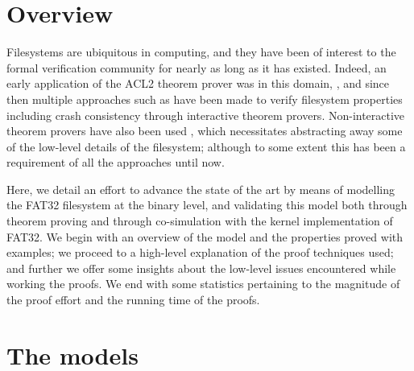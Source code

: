\documentclass[runningheads,a4paper]{llncs}
\begin{document}
\section{Overview}

Filesystems are ubiquitous in computing, and they have been of
interest to the formal verification community for nearly as long as it
has existed. Indeed, an early application of the ACL2 theorem prover
was in this domain, \cite{bevier1996executable}, and since then
multiple approaches such as \cite{DBLP:conf/usenix/ChenZCCKZ16} have
been made to verify filesystem properties including crash consistency
through interactive theorem provers. Non-interactive theorem provers
have also been used \cite{Nelson:2017:HPV:3132747.3132748}, which
necessitates abstracting away some of the low-level details of the
filesystem; although to some extent this has been a requirement of all
the approaches until now.

Here, we detail an effort to advance the state of the art
by means of modelling the FAT32 filesystem at the binary level, and
validating this model both through theorem proving and through
co-simulation with the kernel implementation of FAT32. We begin with
an overview of the model and the properties proved with examples; we
proceed to a high-level explanation of the proof techniques used; and
further we offer some insights about the low-level issues encountered
while working the proofs. We end with some statistics pertaining to
the magnitude of the proof effort and the running time of the proofs.

\section{The models}
\end{document}
